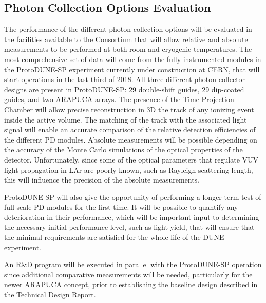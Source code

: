 
\subsection{Photon Collection Options Evaluation}

The performance of the different photon collection options will be 
evaluated in the facilities available to the Consortium that will allow
relative and absolute measurements to be performed at both room and cryogenic temperatures.
The most comprehensive set of data will come from the fully instrumented modules in the ProtoDUNE-SP experiment currently 
under construction at CERN, that will start operations in the last third of \num{2018}.
All  three different photon collector designs are present in ProtoDUNE-SP: \num{29} 
double-shift guides, \num{29} dip-coated guides, and two ARAPUCA arrays. The 
presence of the Time Projection Chamber will allow  precise reconstruction
in 3D the track of any ionizing event inside the active volume. The 
matching of the track with the associated light signal will enable an
accurate comparison of the relative detection efficiencies of the different PD 
modules. 
Absolute measurements will be possible depending on the accuracy of the
Monte Carlo simulations of the optical properties of the detector. 
Unfortunately, since some of the optical parameters that 
regulate VUV light propagation in LAr are poorly known, such as Rayleigh 
scattering length, this will influence the precision of the absolute 
measurements. 

ProtoDUNE-SP will also give the opportunity of performing a longer-term test of full-scale PD modules for the first time. It will be possible to quantify any deterioration in their performance, which will be important input to determining the necessary initial performance level, such as light yield, that will ensure that the minimal requirements are satisfied for the whole life of the DUNE experiment.

An R\&D program will be executed in parallel with the ProtoDUNE-SP operation since 
additional comparative measurements will be needed, particularly for the newer ARAPUCA concept, prior to establishing the baseline design described in the Technical Design Report.




